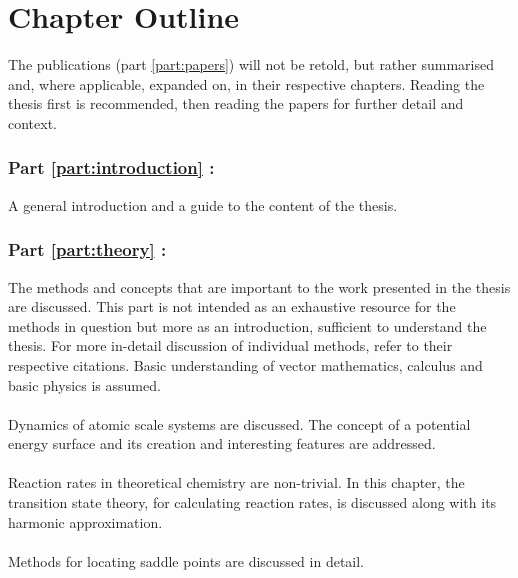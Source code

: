 \section{Chapter Outline}
\label{sec:chapters}

The publications (part \ref{part:papers}) will not be retold, but rather summarised and, where applicable, expanded on, in their respective chapters.
Reading the thesis first is recommended, then reading the papers for further detail and context.

\subsubsection{Part \ref{part:introduction} : }
A general introduction and a guide to the content of the thesis.

\subsubsection{Part \ref{part:theory} : }
The methods and concepts that are important to the work presented in the thesis are discussed.
This part is not intended as an exhaustive resource for the methods in question but more as an introduction, sufficient to understand the thesis.
For more in-detail discussion of individual methods, refer to their respective citations.
Basic understanding of vector mathematics, calculus and basic physics is assumed.

\paragraph{}
Dynamics of atomic scale systems are discussed.
The concept of a potential energy surface and its creation and interesting features are addressed.

\paragraph{}
Reaction rates in theoretical chemistry are non-trivial.
In this chapter, the transition state theory, for calculating reaction rates, is discussed along with its harmonic approximation.

\paragraph{}
Methods for locating saddle points are discussed in detail.

